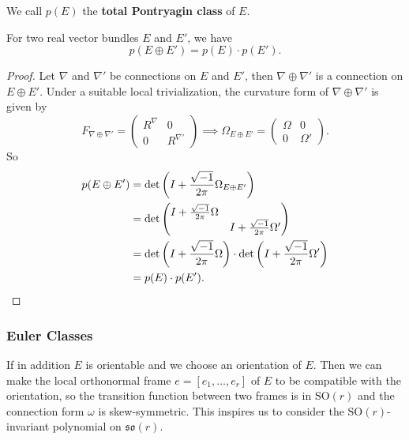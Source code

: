 We call $p(E)$ the \textbf{total Pontryagin class} of $E$.
\begin{proposition}
    For two real vector bundles $E$ and $E'$, we have 
    \begin{equation*}
        p(E\oplus E') = p(E)\cdot p(E').
    \end{equation*}
\end{proposition}
\begin{proof}
    Let $\nabla$ and $\nabla'$ be connections on $E$ and $E'$, then $\nabla\oplus\nabla'$ is a connection on $E\oplus E'$. 
    Under a suitable local trivialization, the curvature form of $\nabla\oplus\nabla'$ is given by 
    \begin{equation*}
        F_{\nabla\oplus\nabla'} = 
        \begin{pmatrix}
            R^\nabla & 0 \\
            0 & R^{\nabla'}
        \end{pmatrix} \implies 
        \Omega_{E\oplus E'} = 
        \begin{pmatrix}
            \Omega & 0 \\
            0 & \Omega'
        \end{pmatrix}.
    \end{equation*}
    So 
    \begin{align*}
        p(E\oplus E')
        &= \det\left(I + \frac{\sqrt{-1}}{2\pi}\Omega_{E\oplus E'}\right) \\ 
        &= \det\begin{pmatrix}
            I + \frac{\sqrt{-1}}{2\pi}\Omega &  \\
             & I + \frac{\sqrt{-1}}{2\pi}\Omega'
        \end{pmatrix} \\
        &= \det\left(I + \frac{\sqrt{-1}}{2\pi}\Omega\right)\cdot\det\left(I + \frac{\sqrt{-1}}{2\pi}\Omega'\right) \\
        &= p(E)\cdot p(E'). \qedhere
    \end{align*}
\end{proof}

\subsubsection{Euler Classes}
If in addition $E$ is orientable and we choose an orientation of $E$. 
Then we can make the local orthonormal frame $e = [e_1,\dots,e_r]$ of $E$ to be compatible with the orientation,  
so the transition function between two frames is in $\mathrm{SO}(r)$ and the connection form $\omega$ is skew-symmetric. 
This inspires us to consider the $\mathrm{SO}(r)$-invariant polynomial on $\mathfrak{so}(r)$. 

